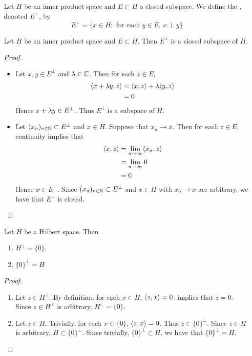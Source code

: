 \documentclass{book}
\begin{document}
\begin{defn}
	Let $H$ be an inner product space and $E \subset H$ a closed subspace. We define the , denoted $E^{\perp}$, by 
	$$E^{\perp} = \{x \in H: \text{ for each $y \in E$, $x \perp y$}\}$$
\end{defn}

\begin{ex}
	Let $H$ be an inner product space and $E \subset H$. Then $E^{\perp}$ is a closed subspace of $H$.
\end{ex}

\begin{proof}\
	\begin{itemize}
		\item Let $x,y \in E^{\perp}$ and $\lambda \in \mathbb{C}$. Then for each $z \in E$, 
		\begin{align*}
			\langle x+ \lambda y,  z\rangle
			& = \langle x, z \rangle + \lambda \langle y, z \rangle \\
			& = 0
		\end{align*}
		Hence $x + \lambda y \in E^{\perp}$. Thus $E^{\perp}$ is a subspace of $H$. 
		\item Let $(x_n)_{n \in \mathbb{N}} \subset E^{\perp}$ and $x \in H$. Suppose that $x_n \rightarrow x$. Then for each $z \in E$, continuity implies that
		\begin{align*}
			\langle x, z \rangle
			& = \lim \limits_{n \rightarrow \infty} \langle x_n, z \rangle \\
			& = \lim \limits_{n \rightarrow \infty} 0 \\
			& = 0
		\end{align*}
		Hence $x \in E^{\perp}$. Since $(x_n)_{n \in \mathbb{N}} \subset E^{\perp}$ and $x \in H$ with $x_n \rightarrow x$ are arbitrary, we have that $E^{\perp}$ is closed.
	\end{itemize}
\end{proof}

\begin{ex}
	Let $H$ be a Hilbert space. Then 
	\begin{enumerate}
		\item $H^{\perp} = \{0\}$.
		\item $\{0\}^{\perp} = H$
	\end{enumerate}
\end{ex}


\begin{proof}\
	\begin{enumerate}
		\item 
		Let $z \in H^{\perp}$. By definition, for each $x \in H$, $\langle z, x \rangle = 0$.  implies that $z = 0$. Since $z \in H^{\perp}$ is arbitrary, $H^{\perp} = \{0\}$. 
		\item Let $z \in H$. Trivially, for each $x \in \{0\}$, $\langle z, x \rangle = 0$. Thus $z \in \{0\}^{\perp}$. Since $z \in H$ is arbitrary, $H \subset \{0\}^{\perp}$. Since trivially, $\{0\}^{\perp} \subset H$, we have that $\{0\}^{\perp} = H$.
	\end{enumerate}
\end{proof}
\end{document}
